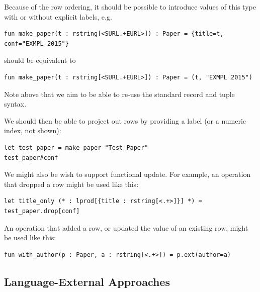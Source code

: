 Because of the row ordering, it should be possible to introduce values of this type with or without explicit labels, e.g.
\begin{lstlisting}[numbers=none]
fun make_paper(t : rstring[<SURL.+EURL>]) : Paper = {title=t, conf="EXMPL 2015"}
\end{lstlisting}
should be equivalent to
\begin{lstlisting}[numbers=none]
fun make_paper(t : rstring[<SURL.+EURL>]) : Paper = (t, "EXMPL 2015")
\end{lstlisting}
Note above that we aim to be able to re-use the standard record and tuple syntax.

We should then be able to project out rows by providing a label (or a numeric index, not shown):
\begin{lstlisting}[numbers=none]
let test_paper = make_paper "Test Paper"
test_paper#conf
\end{lstlisting}

We might also be wish to support functional update. For example, an operation that dropped a row might be used like this:
\begin{lstlisting}[numbers=none]
let title_only (* : lprod[{title : rstring[<.+>]}] *) = test_paper.drop[conf]
\end{lstlisting}
An operation that added a row, or updated the value of an existing row, might be used like this:
\begin{lstlisting}[numbers=none]
fun with_author(p : Paper, a : rstring[<.+>]) = p.ext(author=a)
\end{lstlisting}
\subsection{Language-External Approaches}\label{external-approaches}


